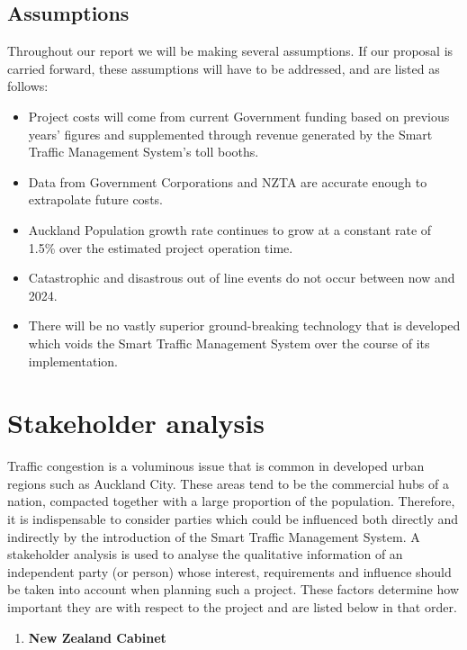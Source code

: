 \documentclass[twoside, a4paper, 11pt]{article}
\begin{document}
\subsection{Assumptions}
Throughout our report we will be making several assumptions. If our proposal is carried forward, these assumptions will have to be addressed, and are listed as follows:
\begin{itemize}
\item Project costs will come from current Government funding based on previous years' figures and supplemented through revenue generated by the Smart Traffic Management System's toll booths.
\item Data from Government Corporations and NZTA are accurate enough to extrapolate future costs.
\item Auckland Population growth rate continues to grow at a constant rate of 1.5\% over the estimated project operation time. \citep{stats17}
\item Catastrophic and disastrous out of line events do not occur between now and 2024.
\item There will be no vastly superior ground-breaking technology that is developed which voids the Smart Traffic Management System over the course of its implementation.
\end{itemize}


\section{Stakeholder analysis}
Traffic congestion is a voluminous issue that is common in developed urban regions such as Auckland City. These areas tend to be the commercial hubs of a nation, compacted together with a large proportion of the population. Therefore, it is indispensable to consider parties which could be influenced both directly and indirectly by the introduction of the Smart Traffic Management System. A stakeholder analysis is used to analyse the qualitative information of an independent party (or person) whose interest, requirements and influence should be taken into account when planning such a project. These factors determine how important they are with respect to the project and are listed below in that order.

\begin{enumerate}[label=\textbf{\arabic*}),leftmargin=0in]
\item \textbf{New Zealand Cabinet}
\end{enumerate}
\end{document}
